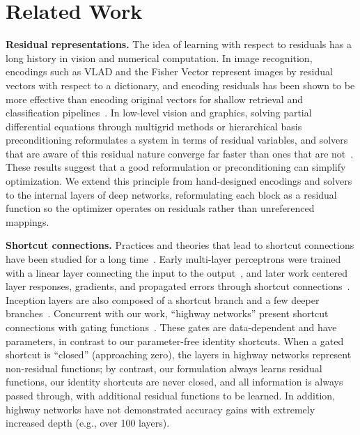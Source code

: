\section{Related Work}
\label{sec:related}

\noindent\textbf{Residual representations.}
The idea of learning with respect to residuals has a long history in vision and
numerical computation. In image recognition, encodings such as VLAD and the
Fisher Vector represent images by residual vectors with respect to a
dictionary, and encoding residuals has been shown to be more effective than
encoding original vectors for shallow retrieval and classification
pipelines~\cite{vlad2010,pq2011,fisher2007,vlfeat2008}. In low-level vision and graphics,
solving partial differential equations through multigrid methods or
hierarchical basis preconditioning reformulates a system in terms of residual
variables, and solvers that are aware of this residual nature converge far
faster than ones that are not~\cite{szeliski1990,szeliski2006,vatanen2013}. These results
suggest that a good reformulation or preconditioning can simplify optimization.
We extend this principle from hand-designed encodings and solvers to the
internal layers of deep networks, reformulating each block as a residual
function so the optimizer operates on residuals rather than unreferenced
mappings.

\noindent\textbf{Shortcut connections.}
Practices and theories that lead to shortcut connections have been studied for a
long time~\cite{bishop1995}. Early multi-layer perceptrons were trained with a linear layer
connecting the input to the output~\cite{ripley1996,venables1999}, and later
work centered layer responses, gradients, and propagated errors through
shortcut connections~\cite{raiko2012,schraudolph1998a,schraudolph1998b}.
Inception layers are also composed of a shortcut branch and a few deeper
branches~\cite{googlenet2015}. Concurrent with our work, ``highway networks''
present shortcut connections with gating
functions~\cite{highway2015,highwaydeep2015,lstm1997}. These gates are data-dependent and
have parameters, in contrast to our parameter-free identity shortcuts. When a
gated shortcut is ``closed'' (approaching zero), the layers in highway networks
represent non-residual functions; by contrast, our formulation always learns
residual functions, our identity shortcuts are never closed, and all
information is always passed through, with additional residual functions to be
learned. In addition, highway networks have not demonstrated accuracy gains with
extremely increased depth (e.g., over 100 layers).

